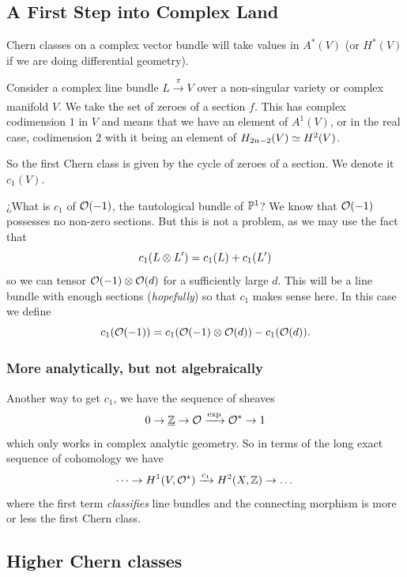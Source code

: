 \documentclass[12pt]{memoir}
\begin{document}
\subsection{A First Step into Complex Land}

Chern classes on a complex vector bundle will take values in $A^*(V)$ (or $H^\ast(V)$ if we are doing differential geometry).\par
Consider a complex line bundle $L\xrightarrow[]{\pi}V$ over a non-singular variety or complex manifold $V$. We take the set of zeroes of a section $f$. This has complex codimension $1$ in $V$ and means that we have an element of $A^1(V)$, or in the real case, codimension $2$ with it being an element of $H_{2n-2}(V)\simeq H^2(V)$.\par 
So the first Chern class is given by the cycle of zeroes of a section. We denote it $c_1(V)$.

\begin{Ex}
    ¿What is $c_1$ of $\mathcal{O}(-1)$, the tautological bundle of $\mathbb{P}^1$? We know that $\mathcal{O}(-1)$ possesses no non-zero sections. But this is not a problem, as we may use the fact that 
    $$c_1(L\otimes L')=c_1(L)+c_1(L')$$
    so we can tensor $\mathcal{O}(-1)\otimes\mathcal{O}(d)$ for a sufficiently large $d$. This will be a line bundle with enough sections (\emph{hopefully}) so that $c_1$ makes sense here. In this case we define 
    $$c_1(\mathcal{O}(-1))=c_1(\mathcal{O}(-1)\otimes\mathcal{O}(d))-c_1(\mathcal{O}(d)).$$
\end{Ex}

\subsubsection{More analytically, but not algebraically}
Another way to get $c_1$, we have the sequence of sheaves 
$$0\to\underline{\mathbb{Z}}\to\mathcal{O}\xrightarrow{\exp}\mathcal{O}^\ast\to 1$$
which only works in complex analytic geometry. So in terms of the long exact sequence of cohomology we have 
$$\dots\to H^1(V,\mathcal{O}^\ast)\xrightarrow{c_1}H^2(X,\mathbb{Z})\to\dots$$
where the first term \emph{classifies} line bundles and the connecting morphism is more or less the first Chern class. 

\subsection{Higher Chern classes}
\end{document}
